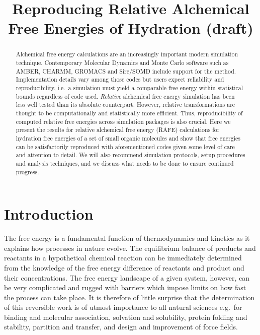 \documentclass[journal=jctcce,manuscript=article]{achemso}
\title{Reproducing Relative Alchemical Free Energies of Hydration
  (draft)}
\begin{document}
\begin{abstract}
  Alchemical free energy calculations are an increasingly important modern simulation
   technique.  Contemporary Molecular Dynamics and Monte Carlo 
  software such as AMBER, CHARMM, GROMACS and Sire/SOMD include support for the 
  method.  Implementation details vary among those codes but users expect 
  reliability and reproducibility, i.e.\ a simulation must yield a comparable 
  free energy within statistical bounds regardless of code used.  
  \emph{Relative} alchemical free energy simulation has been less well tested 
  than its absolute counterpart.  However, relative transformations are thought to 
  be computationally and statistically more efficient.  Thus, reproducibility of computed 
  relative free energies across simulation packages is also crucial. Here we present the 
  results for relative alchemical free energy (RAFE) calculations for hydration free energies of a set of small 
  organic molecules and show that free energies can be satisfactorily 
  reproduced with aforementioned codes given some level of care and attention to detail.  We will also recommend simulation 
  protocols, setup procedures and analysis techniques, and we discuss what 
  needs to be done to ensure continued progress.
\end{abstract}

\begin{tocentry}
\end{tocentry}






\section{Introduction}
\label{sec:intro}

The free energy is a fundamental function of thermodynamics and
kinetics as it explains how processes in nature evolve.  The equilibrium balance of products and reactants in
a hypothetical chemical reaction can be immediately determined
from the knowledge of the free energy difference of reactants and
product and their concentrations.  The free energy landscape of a given system, however, can be
very complicated and rugged with barriers which impose
limits on how fast the process can take place.  It is therefore of
little surprise that the determination of this reversible work is of
utmost importance to all natural sciences e.g.\ for binding and
molecular association, solvation and solubility, protein folding and
stability, partition and transfer, and design and improvement of force
fields.
\end{document}
